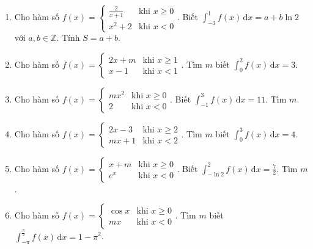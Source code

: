 \documentclass[12pt]{article}
\begin{document}
\begin{enumerate}[label=\textbf{Câu \arabic*.}]
		\item Cho hàm số $f(x) = \begin{cases} \frac{2}{x+1} & \text{khi } x \ge 0 \\ x^2 + 2 & \text{khi } x < 0 \end{cases}$. Biết $\displaystyle \int_{-3}^1 f(x)\,\mathrm{d}x = a + b\ln 2$ với $a, b \in \mathbb{Z}$. Tính $S = a + b$.
		\vspace{0.75cm}
		
		\item Cho hàm số $f(x) = \begin{cases} 2x + m & \text{khi } x \ge 1 \\ x - 1 & \text{khi } x < 1 \end{cases}$. Tìm $m$ biết $\displaystyle \int_0^2 f(x)\,\mathrm{d}x = 3$.
		\vspace{0.75cm}
		
		\item Cho hàm số $f(x) = \begin{cases} mx^2 & \text{khi } x \ge 0 \\ 2 & \text{khi } x < 0 \end{cases}$. Biết $\displaystyle \int_{-1}^3 f(x)\,\mathrm{d}x = 11$. Tìm $m$.
		\vspace{0.75cm}
		
		\item Cho hàm số $f(x) = \begin{cases} 2x - 3 & \text{khi } x \ge 2 \\ mx + 1 & \text{khi } x < 2 \end{cases}$. Tìm $m$ biết $\displaystyle \int_0^3 f(x)\,\mathrm{d}x = 4$.
		\vspace{0.75cm}
		
		\item Cho hàm số $f(x) = \begin{cases} x + m & \text{khi } x \ge 0 \\ e^x & \text{khi } x < 0 \end{cases}$. Biết $\displaystyle \int_{-\ln 2}^2 f(x)\,\mathrm{d}x = \frac{7}{2}$. Tìm $m$.
		\vspace{0.75cm}
		
		\item Cho hàm số $f(x) = \begin{cases} \cos x & \text{khi } x \ge 0 \\ mx & \text{khi } x < 0 \end{cases}$. Tìm $m$ biết $\displaystyle \int_{-\pi}^{\frac{\pi}{2}} f(x)\,\mathrm{d}x = 1 - \pi^2$.
		\vspace{0.75cm}
		

\end{enumerate}
\end{document}
